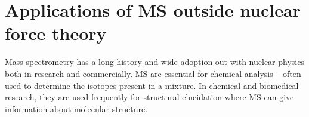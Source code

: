 \section{Applications of MS outside nuclear force theory}

Mass spectrometry has a long history and wide adoption out with nuclear physics both in research and commercially.
MS are essential for chemical analysis – often used to determine the isotopes present in a mixture.
In chemical and biomedical research, they are used frequently for structural elucidation where MS can give information about molecular structure.
